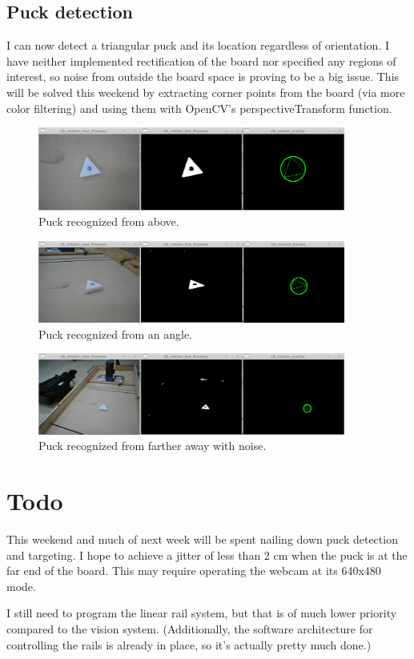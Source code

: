 \documentclass[12pt,letterpaper]{article}
\begin{document}
\subsection*{Puck detection}

I can now detect a triangular puck and its location regardless of orientation.
I have neither implemented rectification of the board nor specified any regions
of interest, so noise from outside the board space is proving to be a big
issue. This will be solved this weekend by extracting corner points from the
board (via more color filtering) and using them with OpenCV's
perspectiveTransform function.

\begin{figure}[!h]
	\centering
	\includegraphics[width=0.9\textwidth]{puck1.png}
	\caption{Puck recognized from above.}
	\label{fig:puck1}
\end{figure}

\begin{figure}[!h]
	\centering
	\includegraphics[width=0.9\textwidth]{puck2.png}
	\caption{Puck recognized from an angle.}
	\label{fig:puck2}
\end{figure}

\begin{figure}[!h]
	\centering
	\includegraphics[width=0.9\textwidth]{puck3.png}
	\caption{Puck recognized from farther away with noise.}
	\label{fig:puck3}
\end{figure}


\section*{Todo}

This weekend and much of next week will be spent nailing down puck detection
and targeting. I hope to achieve a jitter of less than 2 cm when the puck is at
the far end of the board. This may require operating the webcam at its 640x480
mode.

I still need to program the linear rail system, but that is of much lower
priority compared to the vision system. (Additionally, the software
architecture for controlling the rails is already in place, so it's actually
pretty much done.)
\end{document}
